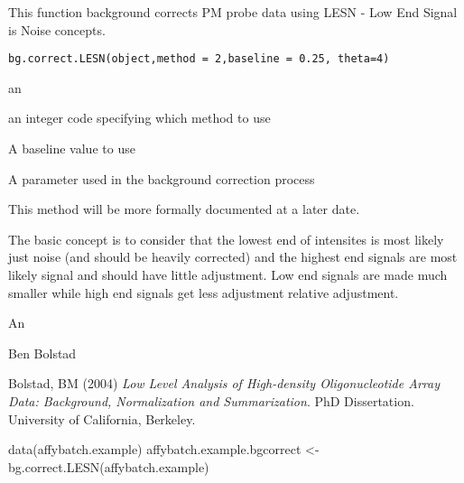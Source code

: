\begin{Description}\relax
This function background corrects PM probe data using LESN - Low End
Signal is Noise concepts.
\end{Description}
\begin{Usage}
\begin{verbatim}
bg.correct.LESN(object,method = 2,baseline = 0.25, theta=4)
\end{verbatim}
\end{Usage}
\begin{Arguments}
\begin{ldescription}
\item[\code{object}] an 
\item[\code{method}] an integer code specifying which method to use
\item[\code{baseline}] A baseline value to use
\item[\code{theta}] A parameter used in the background correction process
\end{ldescription}
\end{Arguments}
\begin{Details}\relax
This method will be more formally documented at a later date.

The basic concept is to consider that the lowest end of intensites is
most likely just noise (and should be heavily corrected) and the
highest end signals are most likely signal and should have little
adjustment. Low end signals are made much smaller while high end
signals get less adjustment relative adjustment.
\end{Details}
\begin{Value}
An 
\end{Value}
\begin{Author}\relax
Ben Bolstad 
\end{Author}
\begin{References}\relax
Bolstad, BM (2004) \emph{Low Level Analysis of High-density
Oligonucleotide Array Data: Background, Normalization and
Summarization}. PhD Dissertation. University of California, Berkeley.
\end{References}
\begin{Examples}
\begin{ExampleCode}
data(affybatch.example)
affybatch.example.bgcorrect <- bg.correct.LESN(affybatch.example)
\end{ExampleCode}
\end{Examples}

